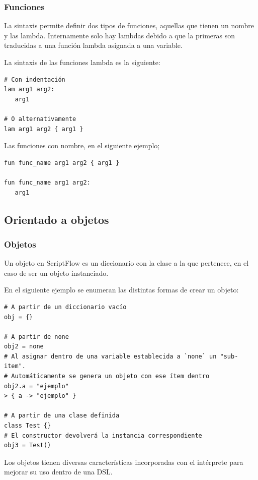 \documentclass[11pt]{article}
\begin{document}
\subsubsection{Funciones}
\label{sec:org7b85754}

La sintaxis permite definir dos tipos de funciones, aquellas que tienen un nombre y las lambda. Internamente solo hay lambdas debido
a que la primeras son traducidas a una función lambda asignada a una variable.

La sintaxis de las funciones lambda es la siguiente:
\begin{verbatim}
# Con indentación
lam arg1 arg2:
   arg1

# O alternativamente
lam arg1 arg2 { arg1 }
\end{verbatim}

Las funciones con nombre, en el siguiente ejemplo;
\begin{verbatim}
fun func_name arg1 arg2 { arg1 }

fun func_name arg1 arg2:
   arg1
\end{verbatim}

\subsection{Orientado a objetos}
\label{sec:org09593a6}

\subsubsection{Objetos}
\label{sec:org05b1be1}
Un objeto en ScriptFlow es un diccionario con la clase a la que pertenece, en el caso de ser
un objeto instanciado.

En el siguiente ejemplo se enumeran las distintas formas de crear un objeto:

\begin{verbatim}
# A partir de un diccionario vacío
obj = {}

# A partir de none
obj2 = none
# Al asignar dentro de una variable establecida a `none` un "sub-item".
# Automáticamente se genera un objeto con ese ítem dentro
obj2.a = "ejemplo"
> { a -> "ejemplo" }

# A partir de una clase definida
class Test {}
# El constructor devolverá la instancia correspondiente
obj3 = Test()
\end{verbatim}

Los objetos tienen diversas características incorporadas con el intérprete para mejorar su uso dentro de una DSL.
\end{document}
